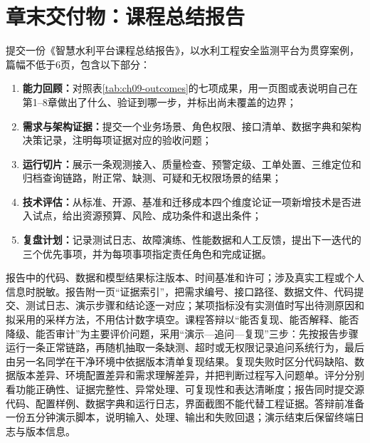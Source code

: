 \section*{章末交付物：课程总结报告}

提交一份《智慧水利平台课程总结报告》，以水利工程安全监测平台为贯穿案例，篇幅不低于6页，包含以下部分：

\begin{enumerate}
\item \textbf{能力回顾：}对照表\ref{tab:ch09-outcomes}的七项成果，用一页图或表说明自己在第1--8章做出了什么、验证到哪一步，并标出尚未覆盖的边界；
\item \textbf{需求与架构证据：}提交一个业务场景、角色权限、接口清单、数据字典和架构决策记录，注明每项证据对应的验收问题；
\item \textbf{运行切片：}展示一条观测接入、质量检查、预警定级、工单处置、三维定位和归档查询链路，附正常、缺测、可疑和无权限场景的结果；
\item \textbf{技术评估：}从标准、开源、基准和迁移成本四个维度论证一项新增技术是否进入试点，给出资源预算、风险、成功条件和退出条件；
\item \textbf{复盘计划：}记录测试日志、故障演练、性能数据和人工反馈，提出下一迭代的三个优先事项，并为每项事项指定责任角色和完成证据。
\end{enumerate}

报告中的代码、数据和模型结果标注版本、时间基准和许可；涉及真实工程或个人信息时脱敏。报告附一页“证据索引”，把需求编号、接口路径、数据文件、代码提交、测试日志、演示步骤和结论逐一对应；某项指标没有实测值时写出待测原因和拟采用的采样方法，不用估计数字填空。课程答辩以“能否复现、能否解释、能否降级、能否审计”为主要评价问题，采用“演示—追问—复现”三步：先按报告步骤运行一条正常链路，再随机抽取一条缺测、超时或无权限记录追问系统行为，最后由另一名同学在干净环境中依据版本清单复现结果。复现失败时区分代码缺陷、数据版本差异、环境配置差异和需求理解差异，并把判断过程写入问题单。评分分别看功能正确性、证据完整性、异常处理、可复现性和表达清晰度；报告同时提交源代码、配置样例、数据字典和运行日志，界面截图不能代替工程证据。答辩前准备一份五分钟演示脚本，说明输入、处理、输出和失败回退；演示结束后保留终端日志与版本信息。

